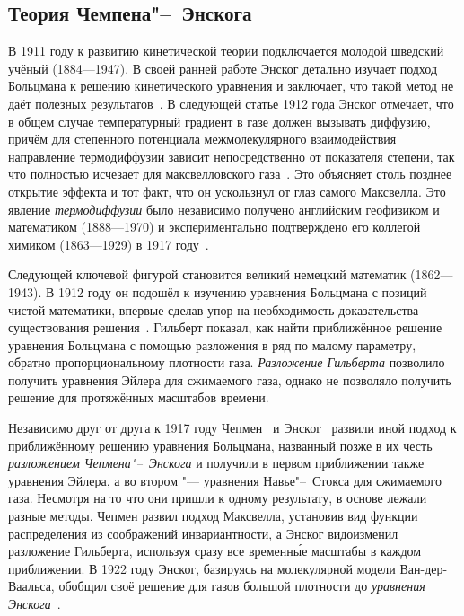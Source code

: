 \documentclass[a4paper, 12pt, oneside]{article} %
\begin{document}
\subsection{Теория Чемпена"--~Энскога}

В 1911 году к развитию кинетической теории подключается молодой шведский
учёный  (1884---1947). В своей ранней работе Энског
детально изучает подход Больцмана к решению кинетического уравнения и
заключает, что такой метод не даёт полезных
результатов~\cite{enskog1911boltzmann}. В следующей статье 1912 года
Энског отмечает, что в общем случае температурный градиент в газе должен
вызывать диффузию, причём для степенного потенциала межмолекулярного
взаимодействия направление термодиффузии зависит непосредственно от
показателя степени, так что полностью исчезает для максвелловского
газа~\cite{enskog1912electron}. Это объясняет столь позднее открытие
эффекта и тот факт, что он ускользнул от глаз самого Максвелла. Это
явление \emph{термодиффузии} было независимо получено английским
геофизиком и математиком  (1888---1970) и
экспериментально подтверждено его коллегой химиком  (1863---1929) в 1917 году~\cite{chapman1917diffusion}.

Следующей ключевой фигурой становится великий немецкий математик
 (1862---1943). В 1912 году он подошёл к изучению
уравнения Больцмана с позиций чистой математики, впервые сделав упор на
необходимость доказательства существования
решения~\cite{hilbert1912grounds}. Гильберт показал, как найти
приближённое решение уравнения Больцмана с помощью разложения в ряд по
малому параметру, обратно пропорциональному плотности газа.
\emph{Разложение Гильберта} позволило получить уравнения Эйлера для
сжимаемого газа, однако не позволяло получить решение для протяжённых
масштабов времени.

Независимо друг от друга к 1917 году Чепмен~\cite{chapman1916kinetic,
chapman1918kinetic} и Энског~\cite{enskog1917thesis} развили иной подход
к приближённому решению уравнения Больцмана, названный позже в их честь
\emph{разложением Чепмена"--~Энскога} и получили в первом приближении
также уравнения Эйлера, а во втором "--- уравнения Навье"--~Стокса для
сжимаемого газа. Несмотря на то что они пришли к одному результату, в
основе лежали разные методы. Чепмен развил подход Максвелла, установив
вид функции распределения из соображений инвариантности, а Энског
видоизменил разложение Гильберта, используя сразу все временн\'{ы}е
масштабы в каждом приближении. В 1922 году Энског, базируясь на
молекулярной модели Ван-дер-Ваальса, обобщил своё решение для газов
большой плотности до \emph{уравнения Энскога}~\cite{enskog1922dense}.
\end{document}
